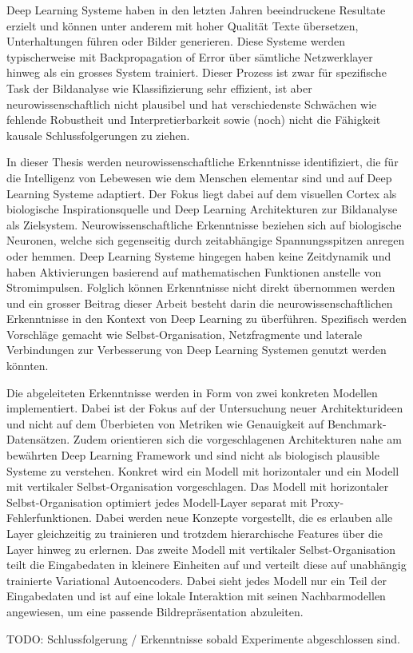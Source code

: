 Deep Learning Systeme haben in den letzten Jahren beeindruckene Resultate erzielt und können unter anderem mit hoher Qualität Texte übersetzen, Unterhaltungen führen oder Bilder generieren. Diese Systeme werden typischerweise mit Backpropagation of Error über sämtliche Netzwerklayer hinweg als ein grosses System trainiert. Dieser Prozess ist zwar für spezifische Task der Bildanalyse wie Klassifizierung sehr effizient, ist aber neurowissenschaftlich nicht plausibel und hat verschiedenste Schwächen wie fehlende Robustheit und Interpretierbarkeit sowie (noch) nicht die Fähigkeit kausale Schlussfolgerungen zu ziehen.

In dieser Thesis werden neurowissenschaftliche Erkenntnisse identifiziert, die für die Intelligenz von Lebewesen wie dem Menschen elementar sind und auf Deep Learning Systeme adaptiert. Der Fokus liegt dabei auf dem visuellen Cortex als biologische Inspirationsquelle und Deep Learning Architekturen zur Bildanalyse als Zielsystem. Neurowissenschaftliche Erkenntnisse beziehen sich auf biologische Neuronen, welche sich gegenseitig durch zeitabhängige Spannungsspitzen anregen oder hemmen. Deep Learning Systeme hingegen haben keine Zeitdynamik und haben Aktivierungen basierend auf mathematischen Funktionen anstelle von Stromimpulsen. Folglich können Erkenntnisse nicht direkt übernommen werden und ein grosser Beitrag dieser Arbeit besteht darin die neurowissenschaftlichen Erkenntnisse in den Kontext von Deep Learning zu überführen. Spezifisch werden Vorschläge gemacht wie Selbst-Organisation, Netzfragmente und laterale Verbindungen zur Verbesserung von Deep Learning Systemen genutzt werden könnten.

Die abgeleiteten Erkenntnisse werden in Form von zwei konkreten Modellen implementiert. Dabei ist der Fokus auf der Untersuchung neuer Architekturideen und nicht auf dem Überbieten von Metriken wie Genauigkeit auf Benchmark-Datensätzen. Zudem orientieren sich die vorgeschlagenen Architekturen nahe am bewährten Deep Learning Framework und sind nicht als biologisch plausible Systeme zu verstehen. Konkret wird ein Modell mit horizontaler und ein Modell mit vertikaler Selbst-Organisation vorgeschlagen. Das Modell mit horizontaler Selbst-Organisation optimiert jedes Modell-Layer separat mit Proxy-Fehlerfunktionen. Dabei werden neue Konzepte vorgestellt, die es erlauben alle Layer gleichzeitig zu trainieren und trotzdem hierarchische Features über die Layer hinweg zu erlernen. Das zweite Modell mit vertikaler Selbst-Organisation teilt die Eingabedaten in kleinere Einheiten auf und verteilt diese auf unabhängig trainierte Variational Autoencoders. Dabei sieht jedes Modell nur ein Teil der Eingabedaten und ist auf eine lokale Interaktion mit seinen Nachbarmodellen angewiesen, um eine passende Bildrepräsentation abzuleiten.

TODO: Schlussfolgerung / Erkenntnisse sobald Experimente abgeschlossen sind.


